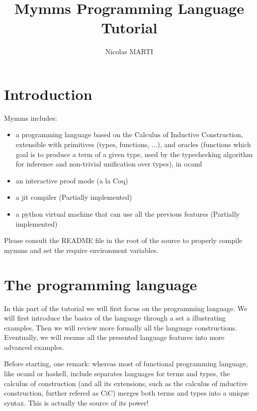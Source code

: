 \documentclass[a4paper,5pt,onecolumn]{article}
\title{Mymms Programming Language Tutorial}
\author{Nicolas MARTI}
\begin{document}
\maketitle


\section{Introduction}

Mymms includes:
\begin{itemize}
\item a programming language based on the Calculus of Inductive
  Construction, extensible with primitives (types, functions, ...),
  and oracles (functions which goal is to produce a term of a given
  type, used by the typechecking algorithm for inference and
  non-trivial unification over types), in ocaml
\item an interactive proof mode (a la Coq)
\item a jit compiler (Partially implemented)
\item a python virtual machine that can use all the previous features
  (Partially implemented)
\end{itemize}

Please consult the README file in the root of the source to properly
compile mymms and set the require environment variables.

\section{The programming language}

In this part of the tutorial we will first focus on the programming
language. We will first introduce the basics of the language through a
set a illustrating examples. Then we will review more formally all the
language constructions. Eventually, we will resume all the presented
language features into more advanced examples.

Before starting, one remark: whereas most of functional programming
language, like ocaml or haskell, include separates languages for terms
and types, the calculus of construction (and all its extensions, such
as the calculus of inductive construction, further refered as CiC)
merges both terms and types into a unique syntax. This is actually the
source of its power!
\end{document}
